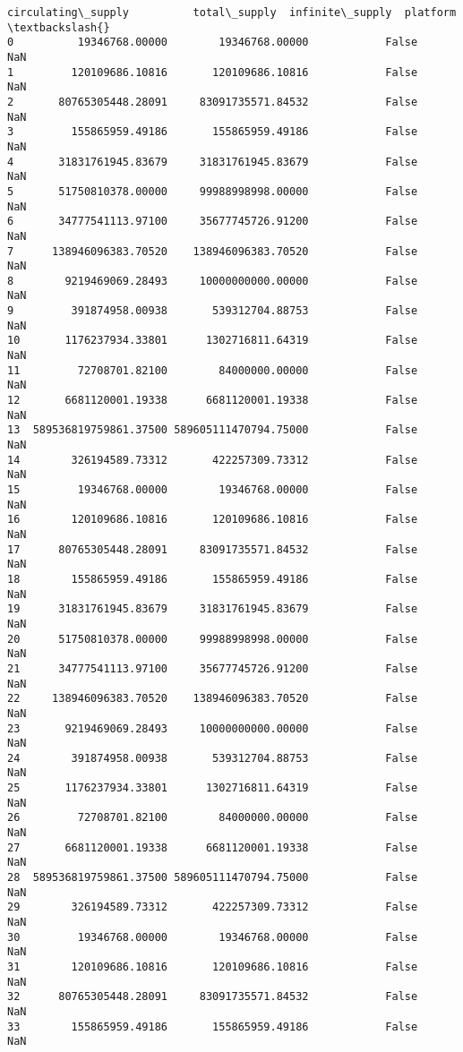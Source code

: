 \documentclass[11pt]{article}
\begin{document}
\begin{tcolorbox}[breakable, size=fbox, boxrule=.5pt, pad at break*=1mm, opacityfill=0]
\begin{Verbatim}[commandchars=\\\{\}]
       circulating\_supply          total\_supply  infinite\_supply  platform  \textbackslash{}
0          19346768.00000        19346768.00000            False       NaN
1         120109686.10816       120109686.10816            False       NaN
2       80765305448.28091     83091735571.84532            False       NaN
3         155865959.49186       155865959.49186            False       NaN
4       31831761945.83679     31831761945.83679            False       NaN
5       51750810378.00000     99988998998.00000            False       NaN
6       34777541113.97100     35677745726.91200            False       NaN
7      138946096383.70520    138946096383.70520            False       NaN
8        9219469069.28493     10000000000.00000            False       NaN
9         391874958.00938       539312704.88753            False       NaN
10       1176237934.33801      1302716811.64319            False       NaN
11         72708701.82100        84000000.00000            False       NaN
12       6681120001.19338      6681120001.19338            False       NaN
13  589536819759861.37500 589605111470794.75000            False       NaN
14        326194589.73312       422257309.73312            False       NaN
15         19346768.00000        19346768.00000            False       NaN
16        120109686.10816       120109686.10816            False       NaN
17      80765305448.28091     83091735571.84532            False       NaN
18        155865959.49186       155865959.49186            False       NaN
19      31831761945.83679     31831761945.83679            False       NaN
20      51750810378.00000     99988998998.00000            False       NaN
21      34777541113.97100     35677745726.91200            False       NaN
22     138946096383.70520    138946096383.70520            False       NaN
23       9219469069.28493     10000000000.00000            False       NaN
24        391874958.00938       539312704.88753            False       NaN
25       1176237934.33801      1302716811.64319            False       NaN
26         72708701.82100        84000000.00000            False       NaN
27       6681120001.19338      6681120001.19338            False       NaN
28  589536819759861.37500 589605111470794.75000            False       NaN
29        326194589.73312       422257309.73312            False       NaN
30         19346768.00000        19346768.00000            False       NaN
31        120109686.10816       120109686.10816            False       NaN
32      80765305448.28091     83091735571.84532            False       NaN
33        155865959.49186       155865959.49186            False       NaN

\end{Verbatim}
\end{tcolorbox}
\end{document}
